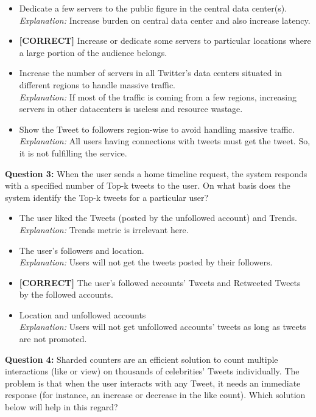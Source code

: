 \begin{itemize}
 \item Dedicate a few servers to the public figure in the central data center(s).
\\[0.1cm]
\textit{Explanation:} 
Increase burden on central data center and also increase latency.
 \item \textbf{[CORRECT]} Increase or dedicate some servers to particular locations where a large portion of the audience belongs.
 \item Increase the number of servers in all Twitter's data centers situated in different regions to handle massive traffic.
\\[0.1cm]
\textit{Explanation:} 
If most of the traffic is coming from a few regions, increasing servers in other datacenters is useless and resource wastage.
 \item Show the Tweet to followers region-wise to avoid handling massive traffic.
\\[0.1cm]
\textit{Explanation:} 
All users having connections with tweets must get the tweet. So, it is not fulfilling the service.
\end{itemize}
\vspace{0.3cm}
\noindent
\textbf{Question 3:} When the user sends a home timeline request, the system responds with a specified number of Top-k tweets to the user. On what basis does the system identify the Top-k tweets for a particular user?
\\[0.2cm]
\begin{itemize}
 \item The user liked the Tweets (posted by the unfollowed account) and Trends.
\\[0.1cm]
\textit{Explanation:} 
Trends metric is irrelevant here.
 \item The user's followers and location.
\\[0.1cm]
\textit{Explanation:} 
Users will not get the tweets posted by their followers.
 \item \textbf{[CORRECT]} The user's followed accounts' Tweets and Retweeted Tweets by the followed accounts.
 \item Location and unfollowed accounts
\\[0.1cm]
\textit{Explanation:} 
Users will not get unfollowed accounts' tweets as long as tweets are not promoted.
\end{itemize}
\vspace{0.3cm}
\noindent
\textbf{Question 4:} Sharded counters are an efficient solution to count multiple interactions (like or view) on thousands of celebrities' Tweets individually. The problem is that when the user interacts with any Tweet, it needs an immediate response (for instance, an increase or decrease in the like count). Which solution below will help in this regard?

